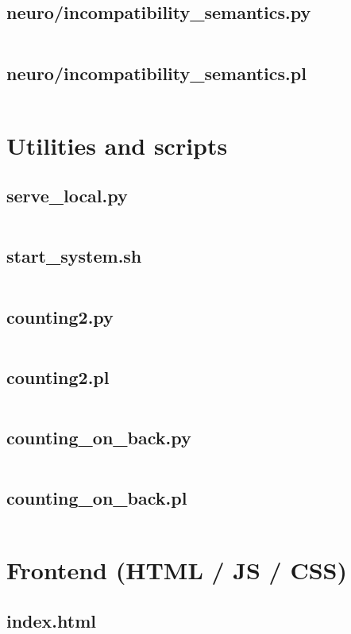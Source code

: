\documentclass{article}
\begin{document}
\subsection{neuro/incompatibility\_semantics.py}
\inputminted{python}{neuro/incompatibility_semantics.py}
\subsection{neuro/incompatibility\_semantics.pl}
\inputminted{prolog}{neuro/incompatibility_semantics.pl}

\section{Utilities and scripts}
\subsection{serve\_local.py}
\inputminted{python}{serve_local.py}
\subsection{start\_system.sh}
\inputminted{bash}{start_system.sh}
\subsection{counting2.py}
\inputminted{python}{counting2.py}
\subsection{counting2.pl}
\inputminted{prolog}{counting2.pl}
\subsection{counting\_on\_back.py}
\inputminted{python}{counting_on_back.py}
\subsection{counting\_on\_back.pl}
\inputminted{prolog}{counting_on_back.pl}

\section{Frontend (HTML / JS / CSS)}
\subsection{index.html}
\inputminted{html}{index.html}
\end{document}
